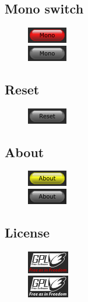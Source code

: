 \subsection{Mono switch}

\begin{figure}[H]
  \centering{}
  \includegraphics[scale=\screenshotscale,clip]{include/images/button_mono_on.png} \\
  \includegraphics[scale=\screenshotscale,clip]{include/images/button_mono_off.png}
\end{figure}

\subsection{Reset}

\begin{figure}[H]
  \centering{}
  \includegraphics[scale=\screenshotscale,clip]{include/images/button_reset.png}
\end{figure}


\subsection{About}

\begin{figure}[H]
  \centering{}
  \includegraphics[scale=\screenshotscale,clip]{include/images/button_about_on.png} \\
  \includegraphics[scale=\screenshotscale,clip]{include/images/button_about_off.png}
\end{figure}

\subsection{License}

\begin{figure}[H]
  \centering{}
  \includegraphics[scale=\screenshotscale,clip]{include/images/button_gpl_on.png} \\
  \includegraphics[scale=\screenshotscale,clip]{include/images/button_gpl_off.png}
\end{figure}

